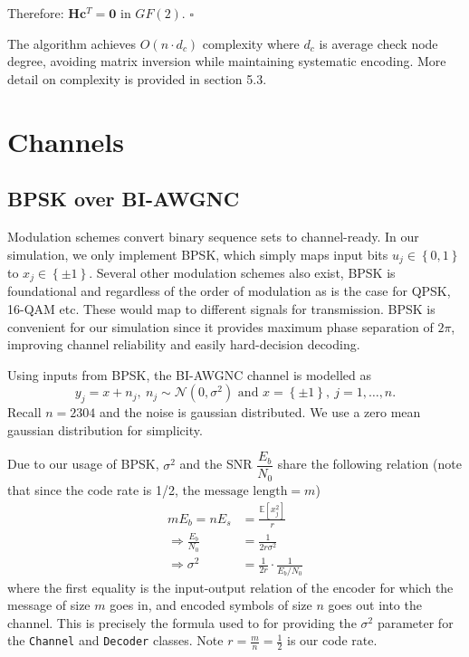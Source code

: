 \documentclass[12pt]{scrreprt}
\begin{document}
	Therefore: $\mathbf{H}\mathbf{c}^T = \mathbf{0}$ in $GF(2)$. $\square$
	
	The algorithm achieves $O(n \cdot d_c)$ complexity where $d_c$ is average check node degree, avoiding matrix inversion while maintaining systematic encoding. More detail on complexity is provided in section 5.3.
	
	
	\chapter{Channels}
	\section{BPSK over BI-AWGNC}
	Modulation schemes convert binary sequence sets to channel-ready. In our simulation, we only implement BPSK, which simply maps input bits $ u_j \in \left\{0, 1 \right\} $ to $x_j \in \left\{\pm 1 \right\}$. Several other modulation schemes also exist, BPSK is foundational and regardless of the order of modulation as is the case for QPSK, 16-QAM etc. These would map to different signals for transmission. BPSK is convenient for our simulation since it provides maximum phase separation of $2\pi$, improving channel reliability and easily hard-decision decoding.
	 
	Using inputs from BPSK, the BI-AWGNC channel is modelled as
	$$ y_j = x + n_j, \: n_j \sim \mathcal{N}(0, \sigma^2) \text{ and } x = \left\{ \pm 1 \right\}, \: j = 1, \ldots, n.$$
	Recall $n = 2304$ and the noise is gaussian distributed. We use a zero mean gaussian distribution for simplicity.
	
	Due to our usage of BPSK, $\sigma^2$ and the SNR $\dfrac{E_b}{N_0}$ share the following relation (note that since the code rate is 1/2, the $\text{message length} = m$) 
	\begin{align}
		m E_b= n E_{s} &= \frac{ \mathbb{E} \left[x_j^2\right]}{r} \\
		\Rightarrow \frac{E_b}{N_0} &= \frac{1}{2 r \sigma^2} \\
		\Rightarrow \sigma^2 &= \frac{1}{2 r} \cdot \frac{1}{E_b/N_0}
	\end{align}
	where the first equality is the input-output relation of the encoder for which the message of size $m$ goes in, and encoded symbols of size $n$ goes out into the channel. This is precisely the formula used to for providing the $\sigma^2$ parameter for the \verb|Channel| and \verb|Decoder| classes. Note $r = \frac{m}{n} = \frac{1}{2}$ is our code rate.
	
\end{document}
